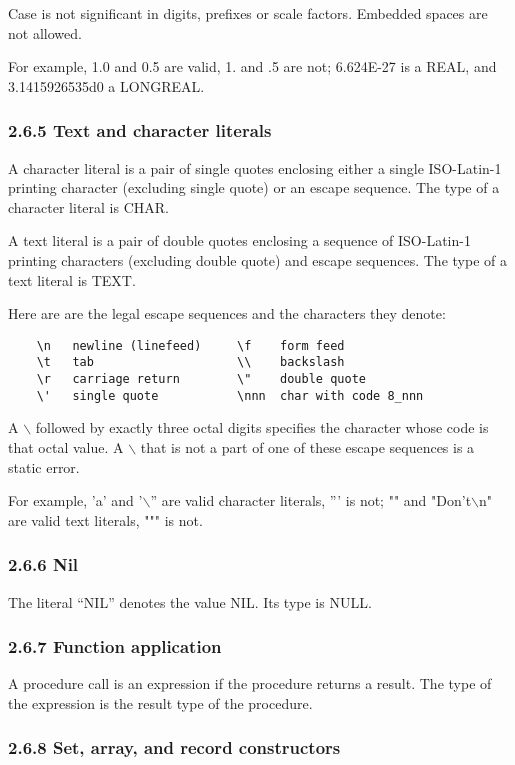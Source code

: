 \documentclass[10pt]{article}
\begin{document}
Case is not significant in digits, prefixes or scale factors. Embedded spaces
are not allowed.

For example, 1.0 and 0.5 are valid, 1. and .5 are not; 6.624E-27 is a REAL,
and 3.1415926535d0 a LONGREAL.

\subsubsection*{2.6.5 Text and character literals}

A character literal is a pair of single quotes enclosing either a single
ISO-Latin-1 printing character (excluding single quote) or an escape
sequence. The type of a character literal is CHAR.

A text literal is a pair of double quotes enclosing a sequence of ISO-Latin-1
printing characters (excluding double quote) and escape sequences. The type of
a text literal is TEXT.

Here are are the legal escape sequences and the characters they denote:
\begin{verbatim}
    \n   newline (linefeed)     \f    form feed
    \t   tab                    \\    backslash
    \r   carriage return        \"    double quote
    \'   single quote           \nnn  char with code 8_nnn
\end{verbatim}
A $\backslash$ followed by exactly three octal digits specifies the character
whose code is that octal value. A $\backslash$ that is not a part of one of
these escape sequences is a static error.

For example, 'a' and '$\backslash$'' are valid character literals, ''' is not;
"" and "Don't$\backslash$n" are valid text literals, """ is not.

\subsubsection*{2.6.6 Nil}

The literal ``NIL'' denotes the value NIL. Its type is NULL.

\subsubsection*{2.6.7 Function application}

A procedure call is an expression if the procedure returns a result. The type
of the expression is the result type of the procedure.

\subsubsection*{2.6.8 Set, array, and record constructors}
\end{document}
